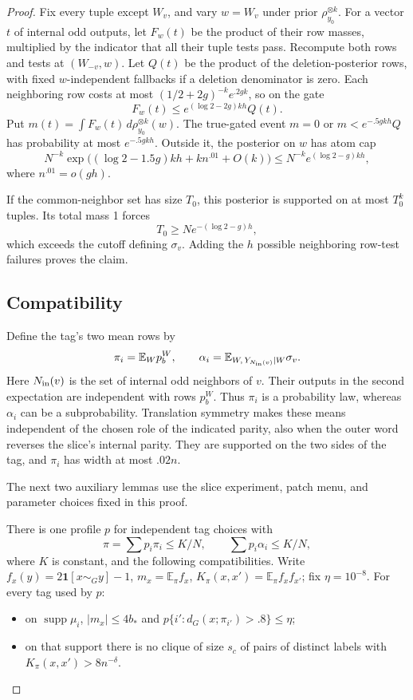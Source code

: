 \begin{proof}
Fix every tuple except \(W_v\), and vary \(w=W_v\) under prior \(\rho_{y_0}^{\otimes k}\). For a vector \(t\) of internal odd outputs, let \(F_w(t)\) be the product of their row masses, multiplied by the indicator that all their tuple tests pass. Recompute both rows and tests at \((W_{-v},w)\). Let \(Q(t)\) be the product of the deletion-posterior rows, with fixed \(w\)-independent fallbacks if a deletion denominator is zero. Each neighboring row costs at most
\((1/2+2g)^{-k}e^{.2gk}\), so on the gate
\[
 F_w(t)\le e^{(\log2-2g)kh}Q(t).
\]
Put \(m(t)=\int F_w(t)\,d\rho_{y_0}^{\otimes k}(w)\). The true-gated event
\(m=0\) or \(m<e^{-.5gkh}Q\)
has probability at most \(e^{-.5gkh}\). Outside it, the posterior on \(w\) has atom cap
\[
 N^{-k}\exp\bigl((\log2-1.5g)kh+k n^{.01}+O(k)\bigr)
       \le N^{-k}e^{(\log2-g)kh},
\]
where \(n^{.01}=o(gh)\).

If the common-neighbor set has size \(T_0\), this posterior is supported on at most \(T_0^k\) tuples. Its total mass 1 forces
\[
 T_0\ge N e^{-(\log2-g)h},
\]
which exceeds the cutoff defining \(\sigma_v\). Adding the \(h\) possible neighboring row-test failures proves the claim.

\subsection{Compatibility}
\label{sec:compatibility}

Define the tag's two mean rows by
\[
 \pi_i=\mathbb E_W p_b^W,\qquad
 \alpha_i=\mathbb E_{W,\,Y_{N_{\rm in}(v)}\mid W}\sigma_v.
\]
Here \(N_{\rm in}(v)\) is the set of internal odd neighbors of \(v\). Their outputs in the second expectation are independent with rows \(p_b^W\). Thus \(\pi_i\) is a probability law, whereas \(\alpha_i\) can be a subprobability. Translation symmetry makes these means independent of the chosen role of the indicated parity, also when the outer word reverses the slice's internal parity. They are supported on the two sides of the tag, and \(\pi_i\) has width at most \(.02n\).

The next two auxiliary lemmas use the slice experiment, patch menu, and parameter choices fixed in this proof.

\begin{lemma}\label{lem:compatible-balanced-profile}
There is one profile \(p\) for independent tag choices with
\begin{equation}
 \pi=\sum p_i\pi_i\le K/N,\qquad \sum p_i\alpha_i\le K/N,
 \label{eq:source-7}
\end{equation}
where \(K\) is constant, and the following compatibilities. Write \(f_x(y)=2\mathbf1[x\sim_G y]-1\), \(m_x=\mathbb E_\pi f_x\), \(K_\pi(x,x')=\mathbb E_\pi f_x f_{x'}\); fix \(\eta=10^{-8}\). For every tag used by \(p\):
\begin{itemize}
\item on \(\operatorname{supp}\mu_i\), \(|m_x|\le4b_*\) and \(p\{i':d_G(x;\pi_{i'})>.8\}\le\eta\);
\item on that support there is no clique of size \(s_c\) of pairs of distinct labels with \(K_\pi(x,x')>8n^{-\delta}\).
\end{itemize}
\end{lemma}


\end{proof}
